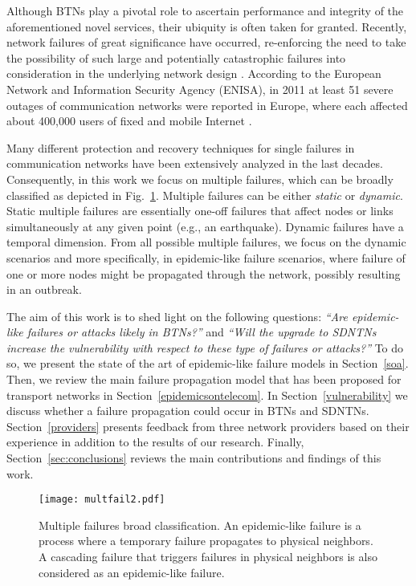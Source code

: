 \documentclass[10pt,draftclsnofoot,onecolumn,journal]{IEEEtran}
\begin{document}
Although BTNs play a pivotal role to ascertain performance and integrity of the aforementioned novel services, their ubiquity is often taken for granted. Recently, network failures of great significance have occurred, re-enforcing the need to take the possibility of such large and potentially catastrophic failures into consideration in the underlying network design \cite{Habib2013630}. According to the European Network and Information Security Agency (ENISA), in 2011 at least 51 severe outages of communication networks were reported in Europe, where each affected about 400,000 users of fixed and mobile Internet \cite{CCC2011}.

Many different protection and recovery techniques for single failures in communication networks have been extensively analyzed in the last decades. Consequently, in this work we focus on multiple failures, which can be broadly classified as depicted in Fig.~\ref{fig:multfail}. Multiple failures can be either \emph{static} or \emph{dynamic}. Static multiple failures are essentially one-off failures that affect nodes or links simultaneously at any given point (e.g., an earthquake). Dynamic failures have a temporal dimension. From all possible multiple failures, we focus on the dynamic scenarios and more specifically, in epidemic-like failure scenarios, where failure of one or more nodes might be propagated through the network, possibly resulting in an outbreak.

The aim of this work is to shed light on the following questions: \emph{``Are epidemic-like failures or attacks likely in BTNs?''} and \emph{``Will the upgrade to SDNTNs increase the vulnerability with respect to these type of failures or attacks?''} To do so, we present the state of the art of epidemic-like failure models in Section~\ref{soa}. Then, we review the main failure propagation model that has been proposed for transport networks in Section~\ref{epidemicsontelecom}. In Section~\ref{vulnerability} we discuss whether a failure propagation could occur in BTNs and SDNTNs. Section~\ref{providers} presents feedback from three network providers based on their experience in addition to the results of our research. Finally, Section~\ref{sec:conclusions} reviews the main contributions and findings of this work.

\begin{figure}
\centering
\texttt{[image: multfail2.pdf]}
\caption{Multiple failures broad classification. An epidemic-like failure is a process where a temporary failure propagates to physical neighbors. A cascading failure that triggers failures in physical neighbors is also considered as an epidemic-like failure.}
\label{fig:multfail}
\end{figure}
\end{document}
